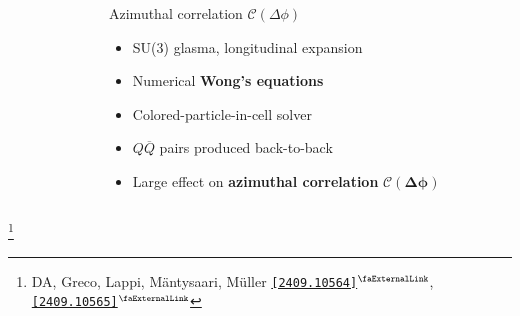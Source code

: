 \documentclass[aspectratio=169,11pt,usenames,dvipsnames]{beamer}
\renewcommand{\thefootnote}{\color{customblue}\faPaperPlaneO}
\newcommand\blfootnote[1]{%
  \begingroup
  \renewcommand\thefootnote{}\footnote{#1}%
  \addtocounter{footnote}{-1}%
  \endgroup
}
\begin{document}
\begin{frame}[t,noframenumbering]
\begin{columns}[onlytextwidth,t]
\begin{figure}
        \end{figure}
        \begin{center}
            {\Large\color{palteal} Azimuthal correlation $\mathcal{C}(\Delta\phi)$\\[10pt]}
            \footnotesize
                \begin{itemize}
                    \item {\color{lightgray}SU(3) glasma, longitudinal expansion}
                    \item {\color{lightgray}Numerical {\bfseries Wong's equations}}
                    \item {\color{lightgray}Colored-particle-in-cell solver}
                    \item {\color{lightgray}$Q\overline{Q}$ pairs produced back-to-back}
                    \item {\color{lightgray}Large effect on {\bfseries azimuthal correlation} $\boldsymbol{\mathcal{C}(\Delta\phi)}$}
                \end{itemize}
        \end{center}
    \end{columns}
    \vspace{-5pt}
    \blfootnote{\scriptsize DA, Greco, Lappi, Mäntysaari, M\"{u}ller \href{https://arxiv.org/abs/2409.10564}{\color{palgold}\texttt{[2409.10564]}$^\text{\scalebox{0.9}{\faExternalLink}}$}, \href{https://arxiv.org/abs/2409.10565}{\color{palgold}\texttt{[2409.10565]}$^\text{\scalebox{0.9}{\faExternalLink}}$}}
\end{frame}



\end{document}
